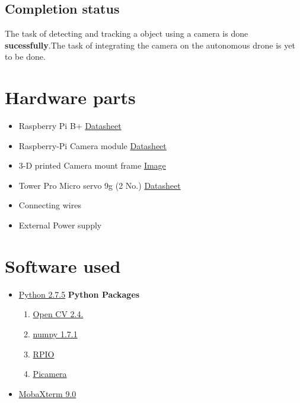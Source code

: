 \documentclass[a4paper,12pt,oneside]{book}
\begin{document}
\subsection*{Completion status}
The task of detecting and tracking a object using a camera is done \textbf{sucessfully}.The task of integrating the camera on the autonomous drone is yet to be done.
\section{Hardware parts}
\begin{itemize}
  \item Raspberry Pi B+
\href{https://github.com/eYSIP-2016/Autonomous-Drone/blob/master/datasheets/raspberry%20pi%20B%2B.pdf}{Datasheet}
  \item Raspberry-Pi Camera module
  \href{https://www.raspberrypi.org/wp-content/uploads/2013/07/RaspiCam-Documentation.pdf}{Datasheet}
  \item 3-D printed Camera mount frame
  \href {https://github.com/eYSIP-2016/Object-Tracking-Camera/blob/master/Tutorials/5.%20Interfacing%20the%20Camera%20and%20Gimbal%20System%20with%20the%20Raspberry-Pi/frame.jpg}{Image}
  \item Tower Pro Micro servo 9g (2 No.)
  \href {http://www.micropik.com/PDF/SG90Servo.pdf}{Datasheet}
  \item Connecting wires
  \item External Power supply
\end{itemize} 
\section{Software used}
\begin{itemize}
  \item \href{https://www.python.org/downloads}{Python 2.7.5}
  \newline \textbf{Python Packages}
  \begin{enumerate}
       \item \href{http://opencv.org/downloads.html}{Open CV 2.4.}
       \item \href{http://opencv.org/downloads.html}{numpy 1.7.1}
       \item \href{https://pypi.python.org/pypi/RPIO}{RPIO}
       \item \href{https://pypi.python.org/pypi/picamera/1.1}{Picamera}
  \end{enumerate}
  \item \href{http://mobaxterm.mobatek.net/download.html}{MobaXterm 9.0}
\end{itemize}
\end{document}
